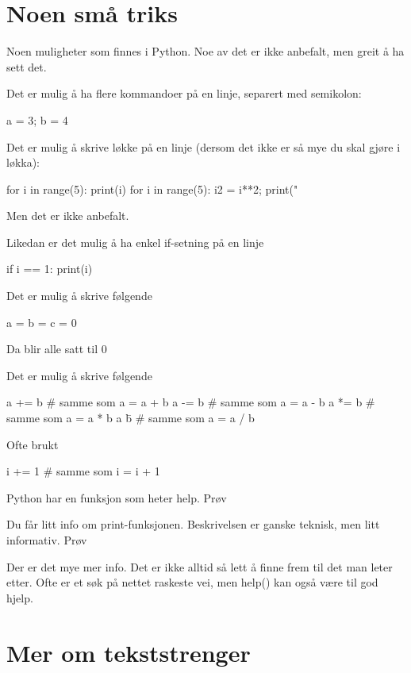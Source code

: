 {\section{Noen små triks}

Noen muligheter som finnes i Python. Noe av det er ikke anbefalt, men greit å ha sett det. 

Det er mulig å ha flere kommandoer på en linje, separert med semikolon:
\begin{usncodebox}
a = 3; b = 4
\end{usncodebox}

Det er mulig å skrive løkke på en linje (dersom det ikke er så mye du skal gjøre i løkka):
\begin{usncodebox}
for i in range(5): print(i)
for i in range(5): i2 = i**2; print("%
\end{usncodebox}

Men det er ikke anbefalt. 

Likedan er det mulig å ha enkel if-setning på en linje
\begin{usncodebox}
if i == 1: print(i)
\end{usncodebox}

Det er mulig å skrive følgende
\begin{usncodebox}
a = b = c = 0
\end{usncodebox}
Da blir alle satt til 0

Det er mulig å skrive følgende
\begin{usncodebox}
a += b    # samme som a = a + b
a -= b    # samme som a = a - b
a *= b    # samme som a = a * b
a \= b    # samme som a = a / b
\end{usncodebox}

Ofte brukt 
\begin{usncodebox}
i += 1    # samme som i = i + 1
\end{usncodebox}

Python har en funksjon som heter help. Prøv 

Du får litt info om print-funksjonen. Beskrivelsen er ganske teknisk, men litt informativ.
Prøv 

Der er det mye mer info. Det er ikke alltid så lett å finne frem til det man leter etter. Ofte er et søk på nettet raskeste vei, men help() kan også være til god hjelp. 

\section{Mer om tekststrenger}

}
